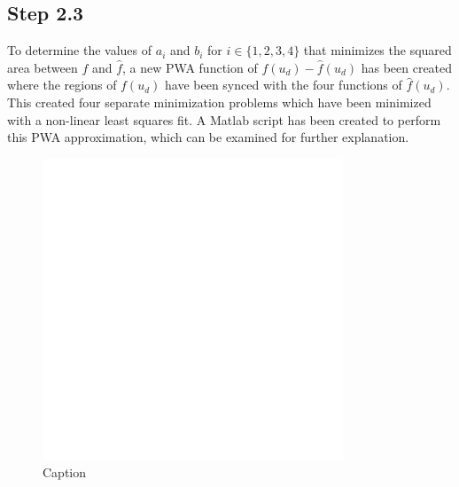\subsection*{Step 2.3}

To determine the values of $a_i$ and $b_i$ for $i \in \{1,2,3,4\}$ that minimizes the squared area between $f$ and $\hat{f}$, a new PWA function of $f(u_d)-\hat{f}(u_d)$ has been created where the regions of $f(u_d)$ have been synced with the four functions of $\hat{f}(u_d)$. This created four separate minimization problems which have been minimized with a non-linear least squares fit. A Matlab script has been created to perform this PWA approximation, which can be examined for further explanation.

\begin{figure}
    \centering
    \includegraphics[width=0.8\textwidth]{Latex/images/test2.pdf}
    \caption{Caption}
    \label{fig:my_label}
\end{figure}
